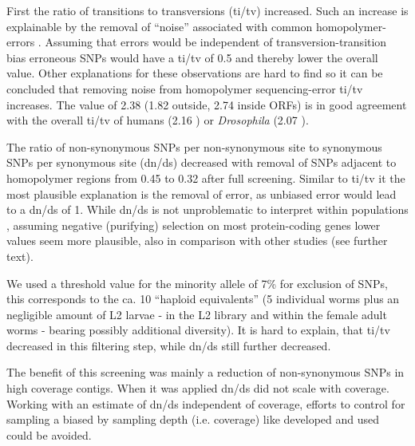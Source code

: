 \documentclass[10pt]{bmc_article}
\newenvironment{bmcformat}{\begin{raggedright}\baselineskip20pt\sloppy\setboolean{publ}{false}}{\end{raggedright}\baselineskip20pt\sloppy}
\begin{document}
\begin{bmcformat}
First the ratio of transitions to transversions (ti/tv) increased.
Such an increase is explainable by the removal of ``noise'' associated
with common homopolymer-errors \cite{pmid21685085}. Assuming that
errors would be independent of transversion-transition bias erroneous
SNPs would have a ti/tv of 0.5 and thereby lower the overall
value. Other explanations for these observations are hard to find so
it can be concluded that removing noise from homopolymer
sequencing-error ti/tv increases.  The value of 2.38
(1.82 outside,
2.74 inside ORFs) is in good agreement with
the overall ti/tv of humans (2.16 \cite{pmid21169219}) or
\textit{Drosophila} (2.07 \cite{pmid21143862}). 

The ratio of non-synonymous SNPs per non-synonymous site to synonymous
SNPs per synonymous site (dn/ds) decreased with removal of SNPs
adjacent to homopolymer regions from 0.45 to
0.32 after full screening. Similar to ti/tv it the most
plausible explanation is the removal of error, as unbiased error would
lead to a dn/ds of 1. While dn/ds is not unproblematic to interpret
within populations \cite{pmid19081788}, assuming negative (purifying)
selection on most protein-coding genes lower values seem more
plausible, also in comparison with other studies (see further text).

We used a threshold value for the minority allele of 7\% for exclusion
of SNPs, this corresponds to the ca. 10 ``haploid equivalents'' (5
individual worms plus an negligible amount of L2 larvae - in the L2
library and within the female adult worms - bearing possibly
additional diversity). It is hard to explain, that ti/tv decreased in
this filtering step, while dn/ds still further decreased.

The benefit of this screening was mainly a reduction of non-synonymous
SNPs in high coverage contigs. When it was applied dn/ds did not
scale with coverage. Working with an estimate of dn/ds independent of
coverage, efforts to control for sampling a biased by sampling depth
(i.e. coverage) like developed \cite{pmid18590545} and used
\cite{pmid20478048} could be avoided.  


\end{bmcformat}
\end{document}
